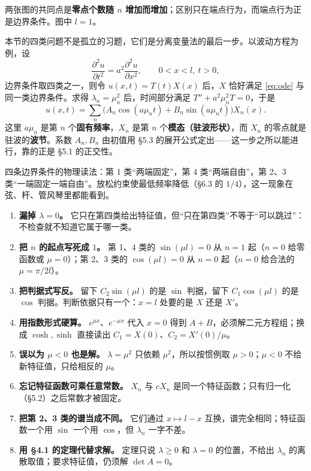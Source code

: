 \documentclass[11pt]{ctexart}
\let\orighdr\hdr
\renewcommand{\hdr}[2]{\needspace{12\baselineskip}\orighdr{#1}{#2}}
\begin{document}
两张图的共同点是\textbf{零点个数随 $n$ 增加而增加}；区别只在端点行为，而端点行为正是边界条件。图中 $l=1$。


本节的四类问题不是孤立的习题，它们是分离变量法的最后一步。以波动方程为例，设
\[
\frac{\partial^2u}{\partial t^2}=a^2\frac{\partial^2u}{\partial x^2},\qquad 0<x<l,\ t>0,
\]
边界条件取四类之一，则令 $u(x,t)=T(t)X(x)$ 后，$X$ 恰好满足 \eqref{eq:ode} 与同一类边界条件。求得 $\lambda_n=\mu_n^2$ 后，时间部分满足 $T''+a^2\mu_n^2T=0$，于是
\[
u(x,t)=\sum_{n}\Big(A_n\cos(a\mu_n t)+B_n\sin(a\mu_n t)\Big)X_n(x).
\]
这里 $a\mu_n$ 是第 $n$ 个\textbf{固有频率}，$X_n$ 是第 $n$ 个\textbf{模态（驻波形状）}，而 $X_n$ 的零点就是驻波的\textbf{波节}。系数 $A_n,B_n$ 由初值用 §5.3 的展开公式定出——这一步之所以能进行，靠的正是 §5.1 的正交性。

四条边界条件的物理读法：第 1 类“两端固定”，第 4 类“两端自由”，第 2、3 类“一端固定一端自由”。放松约束使最低频率降低（§6.3 的 $1/4$），这一现象在弦、杆、管风琴里都能看到。


\begin{enumerate}
  \item \textbf{漏掉 $\lambda=0$。} 它只在第四类给出特征值，但“只在第四类”不等于“可以跳过”：不检查就不知道它属于哪一类。
  \item \textbf{把 $n$ 的起点写死成 $1$。} 第 1、4 类的 $\sin(\mu l)=0$ 从 $n=1$ 起（$n=0$ 给零函数或 $\mu=0$）；第 2、3 类的 $\cos(\mu l)=0$ 从 $n=0$ 起（$n=0$ 给合法的 $\mu=\pi/2l$）。
  \item \textbf{把判据式写反。} 留下 $C_2\sin(\mu l)$ 的是 $\sin$ 判据，留下 $C_1\cos(\mu l)$ 的是 $\cos$ 判据。判断依据只有一个：$x=l$ 处要的是 $X$ 还是 $X'$。
  \item \textbf{用指数形式硬算。} $e^{\mu x}$、$e^{-\mu x}$ 代入 $x=0$ 得到 $A+B$，必须解二元方程组；换成 $\cosh,\sinh$ 直接读出 $C_1=X(0)$、$C_2=X'(0)/\mu$。
  \item \textbf{误以为 $\mu<0$ 也是解。} $\lambda=\mu^2$ 只依赖 $\mu^2$，所以按惯例取 $\mu>0$；$\mu<0$ 不给新特征值，只给相反的 $\mu$。
  \item \textbf{忘记特征函数可乘任意常数。} $X_n$ 与 $cX_n$ 是同一个特征函数；只有归一化（§5.2）之后常数才被固定。
  \item \textbf{把第 2、3 类的谱当成不同。} 它们通过 $x\mapsto l-x$ 互换，谱完全相同；特征函数一个用 $\sin$ 一个用 $\cos$，但 $\lambda_n$ 一字不差。
  \item \textbf{用 §4.1 的定理代替求解。} 定理只说 $\lambda\ge0$ 和 $\lambda=0$ 的位置，不给出 $\lambda_n$ 的离散取值；要求特征值，仍须解 $\det A=0$。
\end{enumerate}
\end{document}
